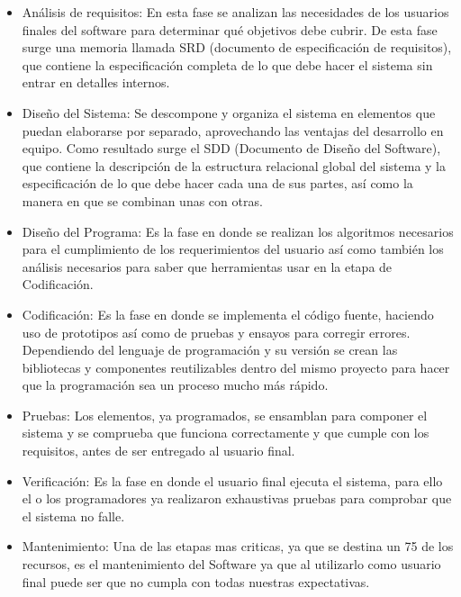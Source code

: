 \begin{itemize}

    \item Análisis de requisitos: En esta fase se analizan las necesidades de los usuarios finales del software para determinar qué objetivos debe cubrir. De esta fase surge una memoria llamada SRD (documento de especificación de requisitos), que contiene la especificación completa de lo que debe hacer el sistema sin entrar en detalles internos. 


    \item Diseño del Sistema: Se descompone y organiza el sistema en elementos que puedan elaborarse por separado, aprovechando las ventajas del desarrollo en equipo. Como resultado surge el SDD (Documento de Diseño del Software), que contiene la descripción de la estructura relacional global del sistema y la especificación de lo que debe hacer cada una de sus partes, así como la manera en que se combinan unas con otras. 

    \item Diseño del Programa: Es la fase en donde se realizan los algoritmos necesarios para el cumplimiento de los requerimientos del usuario así como también los análisis necesarios para saber que herramientas usar en la etapa de Codificación.

    \item Codificación: Es la fase en donde se implementa el código fuente, haciendo uso de prototipos así como de pruebas y ensayos para corregir errores. Dependiendo del lenguaje de programación y su versión se crean las bibliotecas y componentes reutilizables dentro del mismo proyecto para hacer que la programación sea un proceso mucho más rápido.

    \item Pruebas: Los elementos, ya programados, se ensamblan para componer el sistema y se comprueba que funciona correctamente y que cumple con los requisitos, antes de ser entregado al usuario final.


    \item Verificación: Es la fase en donde el usuario final ejecuta el sistema, para ello el o los programadores ya realizaron exhaustivas pruebas para comprobar que el sistema no falle.

    \item Mantenimiento: Una de las etapas mas criticas, ya que se destina un 75 de los recursos, es el mantenimiento del Software ya que al utilizarlo como usuario final puede ser que no cumpla con todas nuestras expectativas.


\end{itemize}

